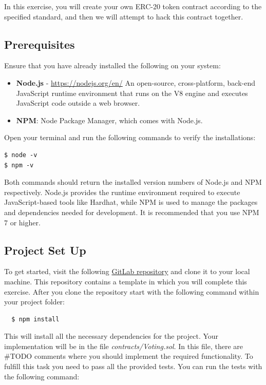 \documentclass[12pt]{article}
\begin{document}
In this exercise, you will create your own ERC-20 token contract according to the specified standard, and then we will attempt to hack this contract together.

\subsection{Prerequisites}

Ensure that you have already installed the following on your system:

\begin{itemize}
    \item \textbf{Node.js} - \url{https://nodejs.org/en/}
    An open-source, cross-platform, back-end JavaScript runtime environment that runs on the V8 engine and executes JavaScript code outside a web browser. 
    \item \textbf{NPM}: Node Package Manager, which comes with Node.js.
\end{itemize}

Open your terminal and run the following commands to verify the installations:

\begin{verbatim}
$ node -v
$ npm -v
\end{verbatim}

Both commands should return the installed version numbers of Node.js and NPM respectively. Node.js provides the runtime environment required to execute JavaScript-based tools like Hardhat, while NPM is used to manage the packages and dependencies needed for development. It is recommended that you use NPM 7 or higher.

\subsection{Project Set Up}

To get started, visit the following \href{https://gitlab.fel.cvut.cz/radovluk/smart-contracts-exercises/-/tree/main/02-Decentralized-Voting-System/task/task-code?ref_type=heads}{GitLab repository} and clone it to your local machine. This repository contains a template in which you will complete this exercise. After you clone the repository start with the following command within your project folder:

\begin{verbatim}
  $ npm install
\end{verbatim}
This will install all the necessary dependencies for the project. Your implementation will be in the file \textit{contracts/Voting.sol}. In this file, there are \#TODO comments where you should implement the required functionality. To fulfill this task you need to pass all the provided tests. You can run the tests with the following command:
\end{document}
